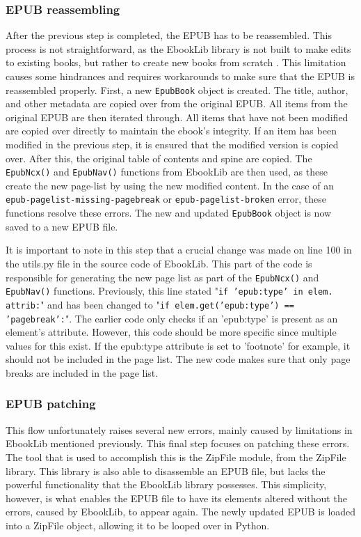 \subsubsection{EPUB reassembling}
After the previous step is completed, the EPUB has to be reassembled. This process is not straightforward, as the EbookLib library is not built to make edits to existing books, but rather to create new books from scratch \cite{EbookLibFAQ}. This limitation causes some hindrances and requires workarounds to make sure that the EPUB is reassembled properly. 
First, a new \texttt{EpubBook} object is created. The title, author, and other metadata are copied over from the original EPUB. All items from the original EPUB are then iterated through. All items that have not been modified are copied over directly to maintain the ebook's integrity. If an item has been modified in the previous step, it is ensured that the modified version is copied over. After this, the original table of contents and spine are copied. The \texttt{EpubNcx()} and \texttt{EpubNav()} functions from EbookLib are then used, as these create the new page-list by using the new modified content. In the case of an \texttt{epub-pagelist-missing-pagebreak} or \texttt{epub-pagelist-broken} error, these functions resolve these errors. The new and updated \texttt{EpubBook} object is now saved to a new EPUB file.

It is important to note in this step that a crucial change was made on line 100 in the utils.py file in the source code of EbookLib. This part of the code is responsible for generating the new page list as part of the \texttt{EpubNcx()} and \texttt{EpubNav()} functions. Previously, this line stated "\texttt{if 'epub:type' in elem.
attrib:}" and has been changed to "\texttt{if elem.get('epub:type') ==
'pagebreak':}". The earlier code only checks if an 'epub:type' is present as an element's attribute. However, this code should be more specific since multiple values for this exist. If the epub:type attribute is set to 'footnote' for example, it should not be included in the page list. The new code makes sure that only page breaks are included in the page list.


\subsubsection{EPUB patching}
This flow unfortunately raises several new errors, mainly caused by limitations in EbookLib mentioned previously. This final step focuses on patching these errors. The tool that is used to accomplish this is the ZipFile module, from the ZipFile library. This library is also able to disassemble an EPUB file, but lacks the powerful functionality that the EbookLib library possesses. This simplicity, however, is what enables the EPUB file to have its elements altered without the errors, caused by EbookLib, to appear again. The newly updated EPUB is loaded into a ZipFile object, allowing it to be looped over in Python.

